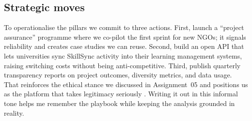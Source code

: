 \subsection*{Strategic moves}
To operationalise the pillars we commit to three actions. First, launch a ``project assurance'' programme where we co-pilot the first sprint for new NGOs; it signals reliability and creates case studies we can reuse. Second, build an open API that lets universities sync SkillSync activity into their learning management systems, raising switching costs without being anti-competitive. Third, publish quarterly transparency reports on project outcomes, diversity metrics, and data usage. That reinforces the ethical stance we discussed in Assignment~05 and positions us as the platform that takes legitimacy seriously \citep{Srnicek2017,Zuboff2019}. Writing it out in this informal tone helps me remember the playbook while keeping the analysis grounded in reality.
